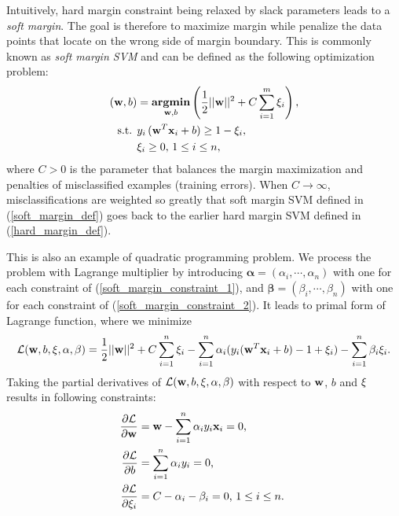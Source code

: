 \documentclass[english]{tktltiki}
\newcommand{\Lcal}{\mathcal{L}}
\newcommand{\argmin}{\textbf{argmin}}
\newcommand{\xb}{{\bf x}}
\newcommand{\wb}{{\bf w}}
\newcommand{\xib}{{\bf \xi}}
\newcommand{\valpha}{\mathbf{\alpha}}
\newcommand{\vbeta}{\mathbf{\beta}}
\begin{document}

Intuitively, hard margin constraint being relaxed by slack parameters leads to a {\em soft margin}. The goal is therefore to maximize margin while penalize the data points that locate on the wrong side of margin boundary. This is commonly known as {\em soft margin SVM} and can be defined as the following optimization problem:
\begin{align}
(\wb,b)  &= \underset{\wb,b}{\operatorname{\argmin}}\left( \frac{1}{2} ||\wb||^2 + C \sum_{i=1}^m \xi_i \right) \text{,} \label{soft_margin_def} \\
\text{ s.t. } & y_i\,(\wb^T \xb_i + b) \ge 1 - \xi_i \text{,} \label{soft_margin_constraint_1} \\
 & \xi_i \ge 0  \text{, } 1 \leq i \leq n \text{,} \label{soft_margin_constraint_2} 
\end{align}
where $C > 0$ is the parameter that balances the margin maximization and penalties of misclassified examples (training errors). When $C \to \infty$, misclassifications are weighted so greatly that soft margin SVM defined in (\ref{soft_margin_def}) goes back to the earlier hard margin SVM defined in (\ref{hard_margin_def}).



This is also an example of quadratic programming problem. We process the problem with Lagrange multiplier by introducing $\valpha = (\alpha_i,\cdots,\alpha_n)$ with one for each constraint of (\ref{soft_margin_constraint_1}), and $\vbeta = (\beta_i,\cdots,\beta_n)$ with one for each constraint of (\ref{soft_margin_constraint_2}). It leads to primal form of Lagrange function, where we minimize
\begin{align}
\Lcal(\wb, b, \xib, \valpha, \vbeta) = \frac{1}{2}||\wb||^2  + C\sum_{i=1}^{n}{\xi_i}- \sum_{i = 1}^n{\alpha_i(y_i(\wb^T \xb_i + b)-1 + \xi_i) - \sum_{i=1}^{n}{\beta_i \xi_i}} \text{.}
\label{soft_margin_primal}
\end{align}
Taking the partial derivatives of $\Lcal(\wb, b, \xib, \valpha, \vbeta)$ with respect to $\wb$, $b$ and $\xib$ results in following constraints:
\begin{align*}
\frac{\partial \Lcal}{\partial \wb} &=  \wb - \sum_{i = 1}^{n}{\alpha_i y_i \xb_i} = 0 \text{,} \\
\frac{\partial \Lcal}{\partial b} &=  \sum_{i = 1}^{n}{\alpha_i y_i} = 0 \text{,} \\
\frac{\partial \Lcal}{\partial \xi_i} &=  C - \alpha_i - \beta_i = 0 \text{, } 1 \leq i \leq n \text{.}\
\end{align*}
\end{document}
